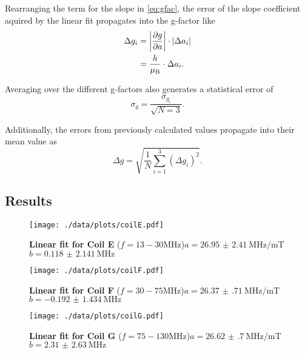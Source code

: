 Rearranging the term for the slope in \autoref{eq:gfac}, the error of the slope coefficient aquired by the linear fit propagates into the g-factor like
\begin{alignat*}{2}
	\Delta g_i &= \abs{\frac{\partial g}{\partial a}}\cdot \abs{\Delta a_i} \\
	&= \frac{h}{\mu_\text{B}}\cdot\Delta a_i.
\end{alignat*}

Averaging over the different g-factors also generates a statistical error of
\begin{equation*}
	\sigma_g = \frac{\sigma_{g_i}}{\sqrt{N=3}}.
\end{equation*}

Additionally, the errors from previously calculated values propagate into their mean value as
\begin{equation*}
	\Delta g = \sqrt{\frac{1}{N}\sum_{i=1}^3 \left(\Delta g_i\right)^2}.
\end{equation*}

\subsection{Results}
\begin{figure}
	\centering
	\texttt{[image: ./data/plots/coilE.pdf]}
	\caption[Linear fit for Coil E]{\textbf{Linear fit for Coil E} ($f=13-30\si{\MHz}$)\newline $a=\SI{26.95(241)}{\MHz\per\milli\tesla}$\newline $b=\SI{0.118(2141)}{\MHz}$}\label{fig:coilE}
\end{figure}
\begin{figure}
	\centering
	\texttt{[image: ./data/plots/coilF.pdf]}
	\caption[Linear fit for Coil F]{\textbf{Linear fit for Coil F} ($f=30-75\si{\MHz}$)\newline $a=\SI{26.37(71)}{\MHz\per\milli\tesla}$\newline $b=\SI{-0.192(1434)}{\MHz}$}\label{fig:coilF}
\end{figure}
\begin{figure}
	\centering
	\texttt{[image: ./data/plots/coilG.pdf]}
	\caption[Linear fit for Coil G]{\textbf{Linear fit for Coil G} ($f=75-130\si{\MHz}$)\newline $a=\SI{26.62(70)}{\MHz\per\milli\tesla}$\newline $b=\SI{2.31(263)}{\MHz}$}\label{fig:coilG}
\end{figure}

